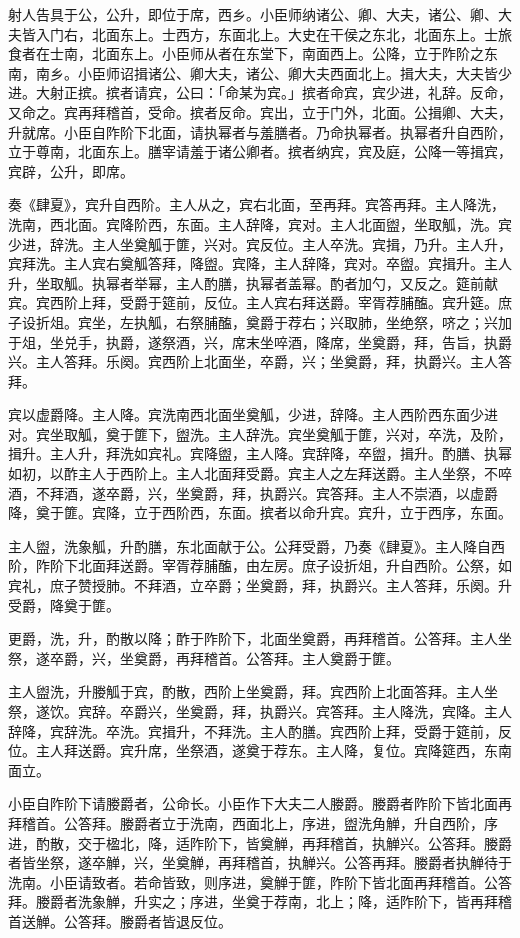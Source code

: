 \documentclass[]{article}
\begin{document}
射人告具于公，公升，即位于席，西乡。小臣师纳诸公、卿、大夫，诸公、卿、大夫皆入门右，北面东上。士西方，东面北上。大史在干侯之东北，北面东上。士旅食者在士南，北面东上。小臣师从者在东堂下，南面西上。公降，立于阼阶之东南，南乡。小臣师诏揖诸公、卿大夫，诸公、卿大夫西面北上。揖大夫，大夫皆少进。大射正摈。摈者请宾，公曰：「命某为宾。」摈者命宾，宾少进，礼辞。反命，又命之。宾再拜稽首，受命。摈者反命。宾出，立于门外，北面。公揖卿、大夫，升就席。小臣自阼阶下北面，请执幂者与羞膳者。乃命执幂者。执幂者升自西阶，立于尊南，北面东上。膳宰请羞于诸公卿者。摈者纳宾，宾及庭，公降一等揖宾，宾辟，公升，即席。

奏《肆夏》，宾升自西阶。主人从之，宾右北面，至再拜。宾答再拜。主人降洗，洗南，西北面。宾降阶西，东面。主人辞降，宾对。主人北面盥，坐取觚，洗。宾少进，辞洗。主人坐奠觚于篚，兴对。宾反位。主人卒洗。宾揖，乃升。主人升，宾拜洗。主人宾右奠觚答拜，降盥。宾降，主人辞降，宾对。卒盥。宾揖升。主人升，坐取觚。执幂者举幂，主人酌膳，执幂者盖幂。酌者加勺，又反之。筵前献宾。宾西阶上拜，受爵于筵前，反位。主人宾右拜送爵。宰胥荐脯醢。宾升筵。庶子设折俎。宾坐，左执觚，右祭脯醢，奠爵于荐右；兴取肺，坐绝祭，哜之；兴加于俎，坐兑手，执爵，遂祭酒，兴，席末坐啐酒，降席，坐奠爵，拜，告旨，执爵兴。主人答拜。乐阕。宾西阶上北面坐，卒爵，兴；坐奠爵，拜，执爵兴。主人答拜。

宾以虚爵降。主人降。宾洗南西北面坐奠觚，少进，辞降。主人西阶西东面少进对。宾坐取觚，奠于篚下，盥洗。主人辞洗。宾坐奠觚于篚，兴对，卒洗，及阶，揖升。主人升，拜洗如宾礼。宾降盥，主人降。宾辞降，卒盥，揖升。酌膳、执幂如初，以酢主人于西阶上。主人北面拜受爵。宾主人之左拜送爵。主人坐祭，不啐酒，不拜酒，遂卒爵，兴，坐奠爵，拜，执爵兴。宾答拜。主人不崇酒，以虚爵降，奠于篚。宾降，立于西阶西，东面。摈者以命升宾。宾升，立于西序，东面。

主人盥，洗象觚，升酌膳，东北面献于公。公拜受爵，乃奏《肆夏》。主人降自西阶，阼阶下北面拜送爵。宰胥荐脯醢，由左房。庶子设折俎，升自西阶。公祭，如宾礼，庶子赞授肺。不拜酒，立卒爵；坐奠爵，拜，执爵兴。主人答拜，乐阕。升受爵，降奠于篚。

更爵，洗，升，酌散以降；酢于阼阶下，北面坐奠爵，再拜稽首。公答拜。主人坐祭，遂卒爵，兴，坐奠爵，再拜稽首。公答拜。主人奠爵于篚。

主人盥洗，升媵觚于宾，酌散，西阶上坐奠爵，拜。宾西阶上北面答拜。主人坐祭，遂饮。宾辞。卒爵兴，坐奠爵，拜，执爵兴。宾答拜。主人降洗，宾降。主人辞降，宾辞洗。卒洗。宾揖升，不拜洗。主人酌膳。宾西阶上拜，受爵于筵前，反位。主人拜送爵。宾升席，坐祭酒，遂奠于荐东。主人降，复位。宾降筵西，东南面立。

小臣自阼阶下请媵爵者，公命长。小臣作下大夫二人媵爵。媵爵者阼阶下皆北面再拜稽首。公答拜。媵爵者立于洗南，西面北上，序进，盥洗角觯，升自西阶，序进，酌散，交于楹北，降，适阼阶下，皆奠觯，再拜稽首，执觯兴。公答拜。媵爵者皆坐祭，遂卒觯，兴，坐奠觯，再拜稽首，执觯兴。公答再拜。媵爵者执觯待于洗南。小臣请致者。若命皆致，则序进，奠觯于篚，阼阶下皆北面再拜稽首。公答拜。媵爵者洗象觯，升实之；序进，坐奠于荐南，北上；降，适阼阶下，皆再拜稽首送觯。公答拜。媵爵者皆退反位。
\end{document}
